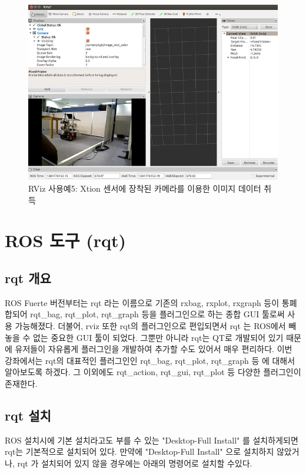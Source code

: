 \begin{figure}[h]
\centering\includegraphics[width=0.6\columnwidth]{pictures/chapter6/rviz_example5.png}
\caption{RViz 사용예5: Xtion 센서에 장착된 카메라를 이용한 이미지 데이터 취득}
\end{figure}

\newpage
\section{ROS 도구 (rqt) }

\subsection{rqt 개요}

ROS Fuerte 버전부터는 rqt 라는 이름으로 기존의 rxbag, rxplot, rxgraph 등이 통폐합되어 rqt\_bag, rqt\_plot, rqt\_graph 등을 플러그인으로 하는 종합 GUI 툴로써 사용 가능해졌다. 더불어, rviz 또한 rqt의 플러그인으로 편입되면서 rqt 는 ROS에서 빼놓을 수 없는 중요한 GUI 툴이 되었다. 그뿐만 아니라 rqt는 QT로 개발되어 있기 때문에 유저들이 자유롭게 플러그인을 개발하여 추가할 수도 있어서 매우 편리하다. 이번 강좌에서는 rqt의 대표적인 플러그인인 rqt\_bag, rqt\_plot, rqt\_graph 등 에 대해서 알아보도록 하겠다. 그 이외에도 rqt\_action, rqt\_gui, rqt\_plot 등 다양한 플러그인이 존재한다.\sloppy

\subsection{rqt 설치}

ROS 설치시에 기본 설치라고도 부를 수 있는 "Desktop-Full Install" 를 설치하게되면 rqt는 기본적으로 설치되어 있다. 만약에 "Desktop-Full Install" 으로 설치하지 않았거나, rqt 가 설치되어 있지 않을 경우에는 아래의 명령어로 설치할 수있다.

